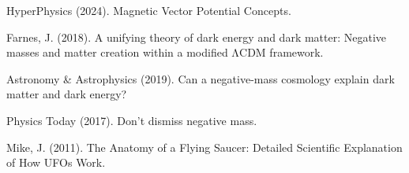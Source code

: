\documentclass[12pt]{article}
\begin{document}

\begin{thebibliography}{9}

HyperPhysics (2024). Magnetic Vector Potential Concepts.

Farnes, J. (2018). A unifying theory of dark energy and dark matter: Negative masses and matter creation within a modified ΛCDM framework.

Astronomy \& Astrophysics (2019). Can a negative-mass cosmology explain dark matter and dark energy?

Physics Today (2017). Don't dismiss negative mass.

Mike, J. (2011). The Anatomy of a Flying Saucer: Detailed Scientific Explanation of How UFOs Work.

\end{thebibliography}
\end{document}

